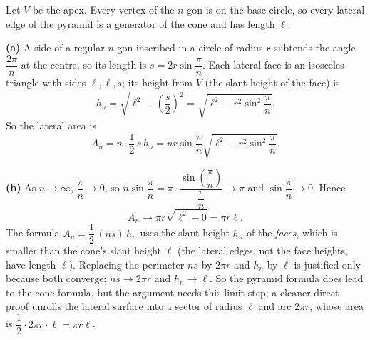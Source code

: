 Let $V$ be the apex. Every vertex of the $n$-gon is on the base circle, so every lateral edge of the pyramid is a generator of the cone and has length $\ell$.


\textbf{(a)} A side of a regular $n$-gon inscribed in a circle of radius $r$ subtends the angle $\dfrac{2\pi}{n}$ at the centre, so its length is $s=2r\sin\dfrac{\pi}{n}$. Each lateral face is an isosceles triangle with sides $\ell,\ell,s$; its height from $V$ (the slant height of the face) is
\[
h_n=\sqrt{\ell^2-\left(\dfrac {s}{2}\right)^2}=\sqrt{\ell^2-r^2\sin^2\dfrac{\pi}{n}} .
\]
So the lateral area is
\[
A_n=n\cdot\dfrac{1}{2}\,s\,h_n=nr\sin\dfrac{\pi}{n}\sqrt{\ell^2-r^2\sin^2\dfrac{\pi}{n}} .
\]

\textbf{(b)} As $n\to\infty$, $\dfrac{\pi}{n}\to0$, so $n\sin\dfrac{\pi}{n}=\pi\cdot\dfrac{\sin\left(\dfrac{\pi}{n}\right)}{\dfrac{\pi}{n}}\to\pi$ and $\sin\dfrac{\pi}{n}\to0$. Hence
\[
A_n\to\pi r\sqrt{\ell^2-0}=\boxed{\pi r\ell}.
\]
The formula $A_n=\dfrac{1}{2}\,(ns)\,h_n$ uses the slant height $h_n$ of the \emph{faces}, which is smaller than the cone's slant height $\ell$ (the lateral edges, not the face heights, have length $\ell$). Replacing the perimeter $ns$ by $2\pi r$ and $h_n$ by $\ell$ is justified only because both converge: $ns\to2\pi r$ and $h_n\to\ell$. So the pyramid formula does lead to the cone formula, but the argument needs this limit step; a cleaner direct proof unrolls the lateral surface into a sector of radius $\ell$ and arc $2\pi r$, whose area is $\dfrac{1}{2}\cdot2\pi r\cdot\ell=\pi r\ell$.
